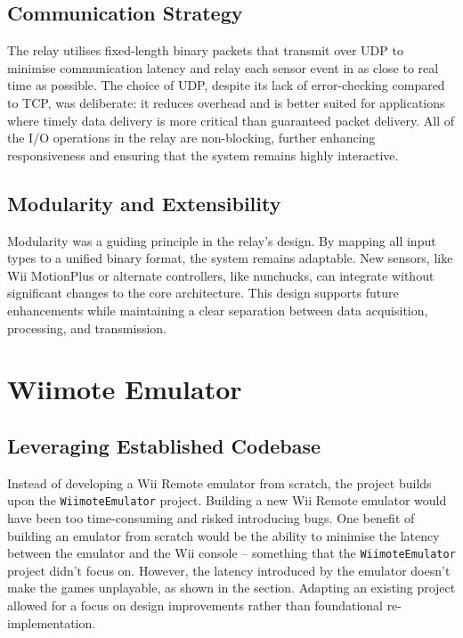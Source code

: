 \subsection{Communication Strategy}
The relay utilises fixed-length binary packets that transmit over UDP to minimise communication latency and relay each sensor event in as close to real time as possible. The choice of UDP, despite its lack of error-checking compared to TCP\cite{wikipediaTCP}, was deliberate: it reduces overhead and is better suited for applications where timely data delivery is more critical than guaranteed packet delivery. All of the I/O operations in the relay are non-blocking, further enhancing responsiveness and ensuring that the system remains highly interactive.

\subsection{Modularity and Extensibility}
Modularity was a guiding principle in the relay’s design. By mapping all input types to a unified binary format, the system remains adaptable. New sensors, like Wii MotionPlus\cite{wikipediaMotionPlus} or alternate controllers, like nunchucks, can integrate without significant changes to the core architecture. This design supports future enhancements while maintaining a clear separation between data acquisition, processing, and transmission.

\section{Wiimote Emulator}

\subsection{Leveraging Established Codebase}
Instead of developing a Wii Remote emulator from scratch, the project builds upon the \texttt{WiimoteEmulator} project. Building a new Wii Remote emulator would have been too time-consuming and risked introducing bugs. One benefit of building an emulator from scratch would be the ability to minimise the latency between the emulator and the Wii console -- something that the \texttt{WiimoteEmulator} project didn't focus on. However, the latency introduced by the emulator doesn't make the games unplayable, as shown in the  section. Adapting an existing project allowed for a focus on design improvements rather than foundational re-implementation.

